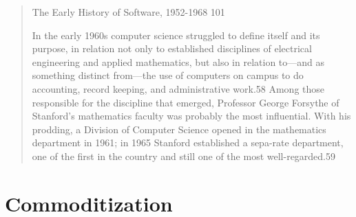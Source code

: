 \begin{quotation}
The Early History of Software, 1952-1968 101

In the early 1960s computer science struggled to define itself and its purpose, 
in relation not only to established disciplines of electrical engineering and 
applied mathematics, but also in relation to—and as something distinct from—the 
use of computers on campus to do accounting, record keeping, and administrative 
work.58 Among those responsible for the discipline that emerged, Professor 
George Forsythe of Stanford's mathematics faculty was probably the most 
influential. With his prodding, a Division of Computer Science opened in the 
mathematics department in 1961; in 1965 Stanford established a sepa-rate 
department, one of the first in the country and still one of the most 
well-regarded.59
\cite{history_of_modern_computing_2003_ceruzzi}
\end{quotation}

\section{Commoditization}


